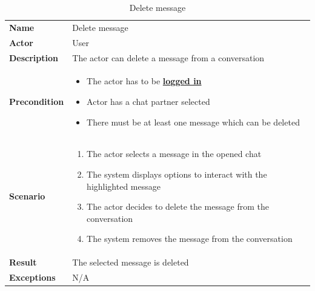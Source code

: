 \begin{table}[ht]
    \caption{Delete message}
    \begin{tabular}{|L{5cm}|L{10cm}|}
        \toprule
        \textbf{Name}        & Delete message                                     \\
        \textbf{Actor}       & User                                               \\
        \textbf{Description} & The actor can delete a message from a conversation \\
        \textbf{Precondition} &
        \vspace{-0.75cm}
        \begin{itemize}
            \setlength\itemsep{-0.5em}
            \item The actor has to be \textbf{\hyperref[tab:table8]{logged in}}
            \item Actor has a chat partner selected
            \item There must be at least one message which can be deleted
        \end{itemize} \\[-0.5cm]
        \textbf{Scenario} &
        \vspace{-0.75cm}
        \begin{enumerate}
            \setlength\itemsep{-0.5em}
            \item The actor selects a message in the opened chat
            \item The system displays options to interact with the highlighted message
            \item The actor decides to delete the message from the conversation
            \item The system removes the message from the conversation
        \end{enumerate} \\[-0.5cm]
        \textbf{Result}      & The selected message is deleted                    \\
        \textbf{Exceptions}  & N/A                                                \\
        \bottomrule
    \end{tabular}
    \label{tab:table20}
\end{table}

